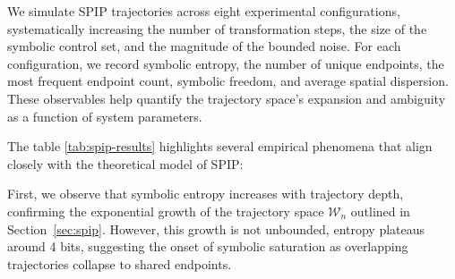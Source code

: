 \documentclass[twocolumn,10pt]{article}
\begin{document}
We simulate SPIP trajectories across eight experimental configurations, systematically increasing the number of transformation steps, the size of the symbolic control set, and the magnitude of the bounded noise. For each configuration, we record symbolic entropy, the number of unique endpoints, the most frequent endpoint count, symbolic freedom, and average spatial dispersion. These observables help quantify the trajectory space's expansion and ambiguity as a function of system parameters.

\begin{table}[htbp]
\centering
\scriptsize
\caption{Summary of Simulation Results}
\label{tab:spip-results}
\end{table}

The table \ref{tab:spip-results} highlights several empirical phenomena that align closely with the theoretical model of SPIP:

First, we observe that symbolic entropy increases with trajectory depth, confirming the exponential growth of the trajectory space $\mathcal{W}_n$ outlined in Section~\ref{sec:spip}. However, this growth is not unbounded, entropy plateaus around 4 bits, suggesting the onset of symbolic saturation as overlapping trajectories collapse to shared endpoints.
\end{document}
